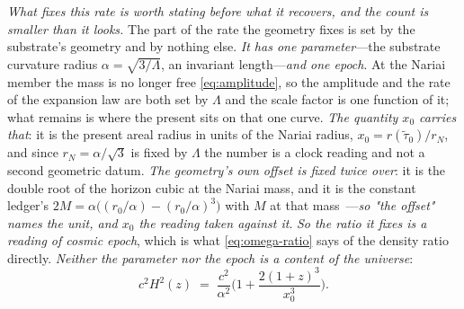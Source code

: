 \documentclass[11pt,a4paper]{article}
\theoremstyle{plain}
\theoremstyle{definition}
\theoremstyle{remark}
\begin{document}
\emph{What fixes this rate is worth stating before what it recovers, and the count is smaller than it looks.} The part of the rate the geometry fixes is set by the substrate's geometry and by nothing else. \emph{It has one parameter}---the substrate curvature radius $\alpha=\sqrt{3/\Lambda}$, an invariant length---\emph{and one epoch}. At the Nariai member the mass is no longer free \eqref{eq:amplitude}, so the amplitude and the rate of the expansion law are both set by $\Lambda$ and the scale factor is one function of it; what remains is where the present sits on that one curve. \emph{The quantity $x_{0}$ carries that}: it is the present areal radius in units of the Nariai radius, $x_{0}=r(\tilde\tau_{0})/r_{N}$, and since $r_{N}=\alpha/\sqrt3$ is fixed by $\Lambda$ the number is a clock reading and not a second geometric datum. \emph{The geometry's own offset is fixed twice over}: it is the double root of the horizon cubic at the Nariai mass, and it is the constant ledger's $2M=\alpha\bigl((r_{0}/\alpha)-(r_{0}/\alpha)^{3}\bigr)$ with $M$ at that mass~\cite{JanzenSlicing,JanzenGeometricCore}---\emph{so "the offset" names the unit, and $x_{0}$ the reading taken against it}. \emph{So the ratio it fixes is a reading of cosmic epoch}, which is what \eqref{eq:omega-ratio} says of the density ratio directly. \emph{Neither the parameter nor the epoch is a content of the universe}:
\begin{equation}\label{eq:native-rate}
c^{2}H^{2}(z)\;=\;\frac{c^{2}}{\alpha^{2}}\Big(1+\frac{2(1+z)^{3}}{x_{0}^{3}}\Big).
\end{equation}
\end{document}
